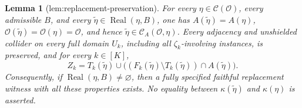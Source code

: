 \documentclass{article}
\newtheorem{lemma}{Lemma}
\begin{document}
\begin{lemma}[lem:replacement-preservation]\label{lem:replacement-preservation}
For every \(\eta\in\mathcal C(\mathcal O)\), every admissible \(B\), and every \(\widetilde\eta\in\operatorname{Real}(\eta,B)\), one has \(A(\widetilde\eta)=A(\eta)\), \(\mathcal O(\widetilde\eta)=\mathcal O(\eta)=\mathcal O\), and hence \(\widetilde\eta\in\mathcal C_A(\mathcal O,\eta)\). Every adjacency and unshielded collider on every full domain \(U_k\), including all \(\zeta_k\)-involving instances, is preserved, and for every \(k\in[K]\),
\[
 Z_k=T_k(\widetilde\eta)\cup
 \bigl((F_k(\widetilde\eta)\setminus T_k(\widetilde\eta))
 \cap A(\widetilde\eta)\bigr).
\]
Consequently, if \(\operatorname{Real}(\eta,B)\ne\varnothing\), then a fully specified faithful replacement witness with all these properties exists. No equality between \(\kappa(\widetilde\eta)\) and \(\kappa(\eta)\) is asserted.
\end{lemma}
\end{document}
